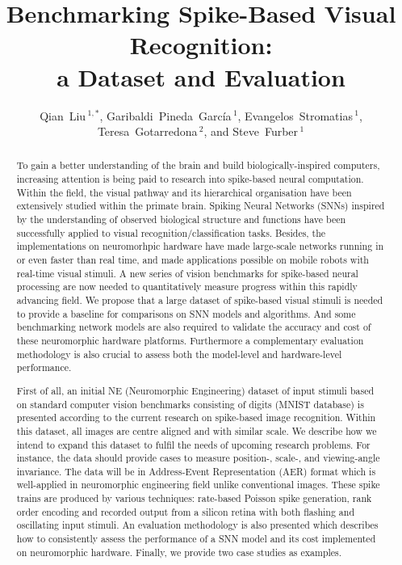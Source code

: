 \documentclass[pdftex]{bioinfo}
\def\firstAuthorLast{Qian Liu {et~al.}} %
\def\Authors{Qian~Liu\,$^{1,*}$, Garibaldi~Pineda~Garc\'ia\,$^{1}$, Evangelos~Stromatias\,$^{1}$, Teresa~Gotarredona\,$^{2}$, and Steve~Furber\,$^{1}$}
\def\Address{$^{1}$SpiNNaker, Advanced Processor Technologies Research Group, School of Computer Science, University of Manchester, Manchester, United Kingdom\\
$^{2}$Instituto de Microelectrónica de Sevilla (IMSE-
CNM-CSIC), Sevilla, Spain }
\begin{document}

\title[Benchmarking Spike-Based Visual Recognition: a Dataset and Evaluation]{Benchmarking  Spike-Based Visual Recognition:\\ a Dataset and Evaluation}
\author[\firstAuthorLast ]{\Authors}
\address{\Address}
\history{}

\editor{}


\maketitle
\begin{abstract}
To gain a better understanding of the brain and build biologically-inspired computers, increasing attention is being paid to research into spike-based neural computation.
Within the field, the visual pathway and its hierarchical organisation have been extensively studied within the primate brain.
Spiking Neural Networks (SNNs) inspired by the understanding of observed biological structure and functions have been successfully applied to visual recognition/classification tasks.
Besides, the implementations on neuromorhpic hardware have made large-scale networks running in or even faster than real time, and made applications possible on mobile robots with real-time visual stimuli.
A new series of vision benchmarks for spike-based neural processing are now needed to quantitatively measure progress within this rapidly advancing field.
We propose that a large dataset of spike-based visual stimuli is needed to provide a baseline for comparisons on SNN models and algorithms.
And some benchmarking network models are also required to validate the accuracy and cost of these neuromorphic hardware platforms.
Furthermore a complementary evaluation methodology is also crucial to assess both the model-level and hardware-level performance.

First of all, an initial NE (Neuromorphic Engineering) dataset of input stimuli based on standard computer vision benchmarks consisting of %
digits (MNIST database) is presented according to the current research on spike-based image recognition.
Within this dataset, all images are centre aligned and with similar scale.
We describe how we intend to expand this dataset to fulfil the needs of upcoming research problems.
For instance, the data should provide cases to measure position-, scale-, and viewing-angle invariance.
The data will be in Address-Event Representation (AER) format which is well-applied in neuromorphic engineering field unlike conventional images.
These spike trains are produced by various techniques: rate-based Poisson spike generation, rank order encoding and recorded output from a silicon retina with both flashing and oscillating input stimuli.
An evaluation methodology is also presented which describes how to consistently assess the performance of a SNN model and its cost implemented on neuromorphic hardware.
Finally, we provide two case studies as examples.


\end{abstract}
\end{document}
